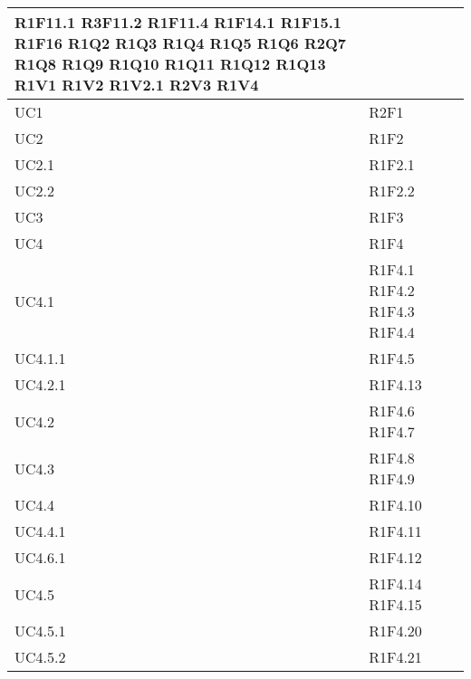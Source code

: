 \begin{center}
\begin{longtable}{|p{44mm}|p{22mm}|}
	R1F11.1\newline
	R3F11.2\newline
	R1F11.4\newline
	R1F14.1\newline
	R1F15.1	\newline
	R1F16  \newline
	R1Q2  \newline
	R1Q3  \newline
	R1Q4   \newline	
	R1Q5  \newline
	R1Q6  \newline
	R2Q7  \newline
	R1Q8  \newline
	R1Q9  \newline
	R1Q10   \newline	
	R1Q11 \newline
	R1Q12 \newline
	R1Q13  \newline
	R1V1 \newline
	R1V2 \newline
	R1V2.1\newline
	R2V3  \newline
	R1V4   
\\
\hline
UC1 & R2F1  \\
\hline
UC2 & R1F2  \\
\hline
UC2.1 & R1F2.1  \\
\hline
UC2.2 & R1F2.2  \\
\hline
UC3 & R1F3  \\
\hline
UC4& R1F4 \\
\hline
UC4.1& 
	R1F4.1  \newline
	R1F4.2 \newline
	R1F4.3 \newline
	R1F4.4 
 \\
\hline
UC4.1.1& R1F4.5 \\
\hline
UC4.2.1& R1F4.13\\
\hline
UC4.2& 
	R1F4.6  \newline
	R1F4.7 
   \\
\hline
UC4.3& 
	R1F4.8  \newline
	R1F4.9 
   \\
\hline
UC4.4& R1F4.10\\
\hline
UC4.4.1& R1F4.11 \\
\hline
UC4.6.1& R1F4.12 \\
\hline

UC4.5&  
R1F4.14  \newline
R1F4.15  	
  \\ \hline
UC4.5.1 & R1F4.20  \\
\hline
UC4.5.2 & R1F4.21 \\
\hline


\end{longtable}
\end{center}
